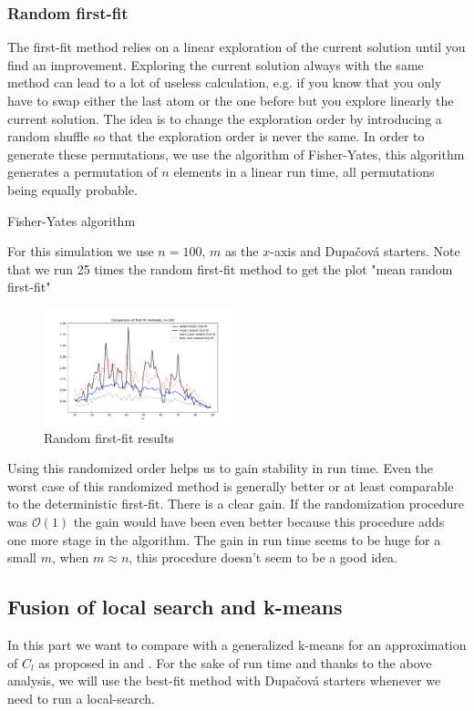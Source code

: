\documentclass{amsart}
\begin{document}
\subsubsection{Random first-fit}
The first-fit method relies on a linear exploration of the current solution until you find an improvement. Exploring the current solution always with the same method can lead to a lot of useless calculation, e.g. if you know that you only have to swap either the last atom or the one before but you explore linearly the current solution. The idea is to change the exploration order by introducing a random shuffle so that the exploration order is never the same. In order to generate these permutations, we use the algorithm of Fisher-Yates, this algorithm generates a permutation of $n$ elements in a linear run time, all permutations being equally probable.
\begin{algorithm}\caption{Fisher-Yates algorithm}\label{fisher yat}
\end{algorithm}
For this simulation we use $n=100$, $m$ as the $x$-axis and Dupačová starters. Note that we run 25 times the random first-fit method to get the plot "mean random first-fit"
\begin{figure}[!h]
    \centering
    \includegraphics[width=0.5\textwidth]{plots/random first fit.pdf}
    \caption{Random first-fit results}
    \label{random ff}
\end{figure}
Using this randomized order helps us to gain stability in run time. Even the worst case of this randomized method is generally better or at least comparable to the deterministic first-fit. There is a clear gain. If the randomization procedure was $\mathcal{O}\left(1\right)$ the gain would have been even better because this procedure adds one more stage in the algorithm. The gain in run time seems to be huge for a small $m$, when $m\approx n$, this procedure doesn't seem to be a good idea.
\subsection{Fusion of local search and k-means}
In this part we want to compare   with a generalized k-means for an approximation of $C_l$ as proposed in  and . For the sake of run time and thanks to the above analysis, we will use the best-fit method with Dupačová starters whenever we need to run a local-search.
\end{document}
